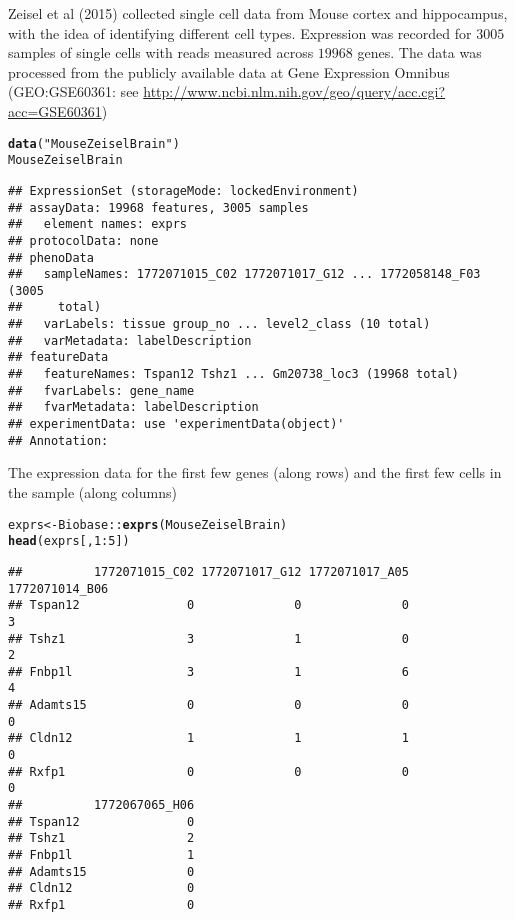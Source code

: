 \documentclass[12pt]{article}\usepackage[]{graphicx}\usepackage[usenames,dvipsnames]{color}
\makeatletter
\newcommand{\hlnum}[1]{\textcolor[rgb]{0.686,0.059,0.569}{#1}}%
\newcommand{\hlstr}[1]{\textcolor[rgb]{0.192,0.494,0.8}{#1}}%
\newcommand{\hlopt}[1]{\textcolor[rgb]{0,0,0}{#1}}%
\newcommand{\hlstd}[1]{\textcolor[rgb]{0.345,0.345,0.345}{#1}}%
\newcommand{\hlkwb}[1]{\textcolor[rgb]{0.69,0.353,0.396}{#1}}%
\newcommand{\hlkwd}[1]{\textcolor[rgb]{0.737,0.353,0.396}{\textbf{#1}}}%
\newenvironment{kframe}{%
 \def\at@end@of@kframe{}%
 \ifinner\ifhmode%
  \def\at@end@of@kframe{\end{minipage}}%
  \begin{minipage}{\columnwidth}%
 \fi\fi%
 \def\FrameCommand##1{\hskip\@totalleftmargin \hskip-\fboxsep
 \colorbox{shadecolor}{##1}\hskip-\fboxsep
     \hskip-\linewidth \hskip-\@totalleftmargin \hskip\columnwidth}%
 \MakeFramed {\advance\hsize-\width
   \@totalleftmargin\z@ \linewidth\hsize
   \@setminipage}}%
 {\par\unskip\endMakeFramed%
 \at@end@of@kframe}
\newenvironment{knitrout}{}{} %
\makeatother
\begin{document}
Zeisel et al (2015) \cite{Zeisel2015} collected single cell data from Mouse cortex and
hippocampus, with the idea of identifying different cell types. Expression was recorded for $3005$ samples of single cells with reads measured across $19968$ genes. The data
was processed from the publicly available data at Gene Expression Omnibus (GEO:GSE60361: see \url{http://www.ncbi.nlm.nih.gov/geo/query/acc.cgi?acc=GSE60361})

\begin{knitrout}
\color{fgcolor}\begin{kframe}
\begin{alltt}
\hlkwd{data}\hlstd{(}\hlstr{"MouseZeiselBrain"}\hlstd{)}
\hlstd{MouseZeiselBrain}
\end{alltt}
\begin{verbatim}
## ExpressionSet (storageMode: lockedEnvironment)
## assayData: 19968 features, 3005 samples 
##   element names: exprs 
## protocolData: none
## phenoData
##   sampleNames: 1772071015_C02 1772071017_G12 ... 1772058148_F03 (3005
##     total)
##   varLabels: tissue group_no ... level2_class (10 total)
##   varMetadata: labelDescription
## featureData
##   featureNames: Tspan12 Tshz1 ... Gm20738_loc3 (19968 total)
##   fvarLabels: gene_name
##   fvarMetadata: labelDescription
## experimentData: use 'experimentData(object)'
## Annotation:
\end{verbatim}
\end{kframe}
\end{knitrout}

The expression data for the first few genes (along rows) and the first few
cells in the sample (along columns)

\begin{knitrout}
\color{fgcolor}\begin{kframe}
\begin{alltt}
\hlstd{exprs} \hlkwb{<-} \hlstd{Biobase}\hlopt{::}\hlkwd{exprs}\hlstd{(MouseZeiselBrain)}
\hlkwd{head}\hlstd{(exprs[,}\hlnum{1}\hlopt{:}\hlnum{5}\hlstd{])}
\end{alltt}
\begin{verbatim}
##          1772071015_C02 1772071017_G12 1772071017_A05 1772071014_B06
## Tspan12               0              0              0              3
## Tshz1                 3              1              0              2
## Fnbp1l                3              1              6              4
## Adamts15              0              0              0              0
## Cldn12                1              1              1              0
## Rxfp1                 0              0              0              0
##          1772067065_H06
## Tspan12               0
## Tshz1                 2
## Fnbp1l                1
## Adamts15              0
## Cldn12                0
## Rxfp1                 0
\end{verbatim}
\end{kframe}
\end{knitrout}
\end{document}
